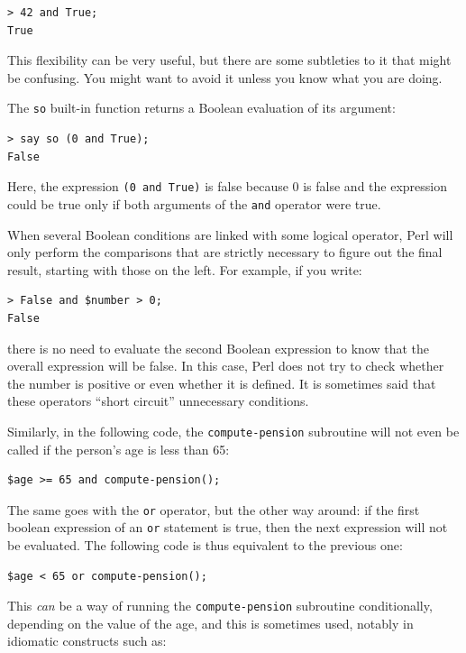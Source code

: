 \begin{verbatim}
> 42 and True;
True
\end{verbatim}
%
This flexibility can be very useful, but there are some 
subtleties to it that might be confusing.  You might want 
to avoid it unless you know what you are doing.

The {\tt so} built-in function returns a Boolean evaluation of 
its argument:

\begin{verbatim}
> say so (0 and True);
False
\end{verbatim}
%
Here, the expression {\tt (0 and True)} is false because 0 
is false and the expression could be true only if both arguments 
of the {\tt and} operator were true.

When several Boolean conditions are linked with some logical 
operator, Perl will only perform the comparisons that are 
strictly necessary to figure out the final result, starting 
with those on the left. For example, if you write:

\begin{verbatim}
> False and $number > 0;
False
\end{verbatim}
%
there is no need to evaluate the second Boolean expression 
to know that the overall expression will be false. In this case, 
Perl does not try to check whether the number is positive or 
even whether it is defined. It is sometimes said that 
these operators ``short circuit'' unnecessary conditions.

Similarly, in the following code, the {\tt compute-pension} 
subroutine will not even be called if the person's age is 
less than 65:

\begin{verbatim}
$age >= 65 and compute-pension();
\end{verbatim}
%
The same goes with the {\tt or} operator, but the other way 
around: if the first boolean expression of an {\tt or} 
statement is true, then the next expression will not be 
evaluated. The following code is thus equivalent to the previous 
one:

\begin{verbatim}
$age < 65 or compute-pension();
\end{verbatim}
% 
This \emph{can} be a way of running the {\tt compute-pension} 
subroutine conditionally, depending on the value of the age, and 
this is sometimes used, notably in idiomatic constructs such as:

